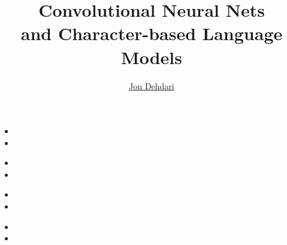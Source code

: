 \documentclass[xcolor=pdftex,x11names,table,hyperref]{beamer}
\begin{document}
\title{Convolutional Neural Nets \\[1.5em]
 \small{and Character-based Language Models} \\[1.0em]
 }
\author{\href{http://jon.dehdari.org}{Jon Dehdari}}
\frame{\titlepage}



\begin{frame}{}
\begin{itemize}
	\item 
	\item 
\end{itemize}
\end{frame}


\begin{frame}{}
\begin{itemize}
	\item 
	\item 
\end{itemize}
\end{frame}


\begin{frame}{}
\begin{itemize}
	\item 
	\item 
\end{itemize}
\end{frame}


\begin{frame}{}
\begin{itemize}
	\item 
	\item 
\end{itemize}
\end{frame}
\end{document}
